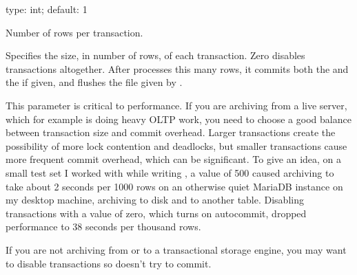 \documentclass[letterpaper,10pt,english]{sphinxmanual}
\begin{document}
\begin{fulllineitems}
\label{\detokenize{mariadb-archiver:cmdoption-mariadb-archiver-txn-size}}
type: int; default: 1

Number of rows per transaction.

Specifies the size, in number of rows, of each transaction. Zero disables
transactions altogether.  After  processes this many rows, it
commits both the {\hyperref[\detokenize{mariadb-archiver:cmdoption-mariadb-archiver-source}]{}} and the {\hyperref[\detokenize{mariadb-archiver:cmdoption-mariadb-archiver-dest}]{}} if given, and flushes the
file given by {\hyperref[\detokenize{mariadb-archiver:cmdoption-mariadb-archiver-file}]{}}.

This parameter is critical to performance.  If you are archiving from a live
server, which for example is doing heavy OLTP work, you need to choose a good
balance between transaction size and commit overhead.  Larger transactions
create the possibility of more lock contention and deadlocks, but smaller
transactions cause more frequent commit overhead, which can be significant.  To
give an idea, on a small test set I worked with while writing , a
value of 500 caused archiving to take about 2 seconds per 1000 rows on an
otherwise quiet MariaDB instance on my desktop machine, archiving to disk and to
another table.  Disabling transactions with a value of zero, which turns on
autocommit, dropped performance to 38 seconds per thousand rows.

If you are not archiving from or to a transactional storage engine, you may
want to disable transactions so  doesn’t try to commit.

\end{fulllineitems}

\end{document}
